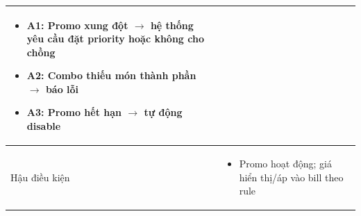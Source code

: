 \begin{longtable}{|>{\raggedright\arraybackslash}p{}|>{\raggedright\arraybackslash}p{}|}
\begin{itemize}[leftmargin=*]
\item A1: Promo xung đột $\rightarrow$ hệ thống yêu cầu đặt priority hoặc không cho chồng
\item A2: Combo thiếu món thành phần $\rightarrow$ báo lỗi
\item A3: Promo hết hạn $\rightarrow$ tự động disable
\end{itemize}
\vspace{-0.5em}
\\
\hline
Hậu điều kiện &
\vspace{-0.5em}
\begin{itemize}[leftmargin=*]
\item Promo hoạt động; giá hiển thị/áp vào bill theo rule
\end{itemize}
\vspace{-0.5em}
\\
\hline
\end{longtable}

